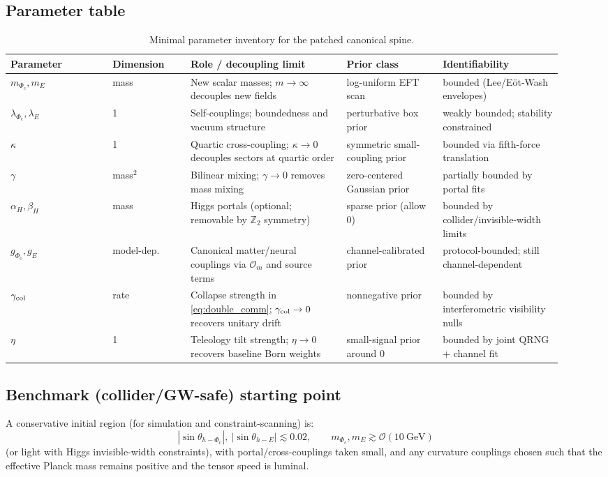 \documentclass[reprint,amsmath,amssymb,aps,showkeys]{revtex4-2}
\theoremstyle{remark}
\newcommand{\Phic}{\Phi_{\mathrm{c}}}
\newcommand{\Eth}{E}
\newcommand{\cO}{\mathcal{O}}
\begin{document}
\subsection{Parameter table}
\begin{table}[h]
\centering
\small
\setlength{\tabcolsep}{6pt}
\begin{tabular}{@{}p{0.17\linewidth}p{0.13\linewidth}p{0.26\linewidth}p{0.16\linewidth}p{0.20\linewidth}@{}}
\toprule
Parameter & Dimension & Role / decoupling limit & Prior class & Identifiability \\
\midrule
$m_{\Phic}, m_{\Eth}$ & mass & New scalar masses; $m\to \infty$ decouples new fields & log-uniform EFT scan & bounded (Lee/E\"ot-Wash envelopes) \\
$\lambda_{\Phic},\lambda_{\Eth}$ & 1 & Self-couplings; boundedness and vacuum structure & perturbative box prior & weakly bounded; stability constrained \\
$\kappa$ & 1 & Quartic cross-coupling; $\kappa\to 0$ decouples sectors at quartic order & symmetric small-coupling prior & bounded via fifth-force translation \\
$\gamma$ & mass$^2$ & Bilinear mixing; $\gamma\to 0$ removes mass mixing & zero-centered Gaussian prior & partially bounded by portal fits \\
$\alpha_H,\beta_H$ & mass & Higgs portals (optional; removable by $\mathbb{Z}_2$ symmetry) & sparse prior (allow 0) & bounded by collider/invisible-width limits \\
$g_{\Phic},g_{\Eth}$ & model-dep. & Canonical matter/neural couplings via $\cO_m$ and source terms & channel-calibrated prior & protocol-bounded; still channel-dependent \\
$\gamma_{\rm col}$ & rate & Collapse strength in \eqref{eq:double_comm}; $\gamma_{\rm col}\to 0$ recovers unitary drift & nonnegative prior & bounded by interferometric visibility nulls \\
$\eta$ & 1 & Teleology tilt strength; $\eta\to 0$ recovers baseline Born weights & small-signal prior around 0 & bounded by joint QRNG + channel fit \\
\bottomrule
\end{tabular}
\caption{Minimal parameter inventory for the patched canonical spine.}
\label{tab:params}
\end{table}

\subsection{Benchmark (collider/GW-safe) starting point}
A conservative initial region (for simulation and constraint-scanning) is:
\[
|\sin\theta_{h-\Phic}|,\ |\sin\theta_{h-\Eth}|\lesssim 0.02,\qquad
m_{\Phic},m_{\Eth}\gtrsim \mathcal{O}(10~\mathrm{GeV})
\]
(or light with Higgs invisible-width constraints), with portal/cross-couplings taken small,
and any curvature couplings chosen such that the effective Planck mass remains positive and the
tensor speed is luminal.
\end{document}
